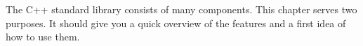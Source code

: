 The C++ standard library consists of many components. This chapter serves two purposes. It should give you a quick overview of the features and a first idea of how to use them.
